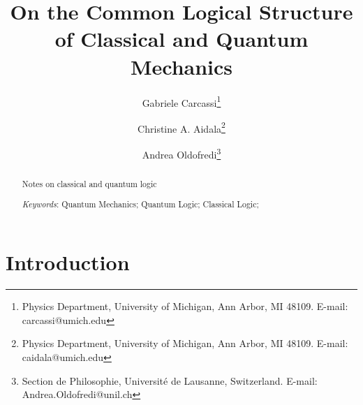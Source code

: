 \documentclass[11pt, executivepaper]{article}
\begin{document}
\title{\textbf{On the Common Logical Structure of Classical and Quantum Mechanics}}

\author{Gabriele Carcassi\thanks{Physics Department, University of Michigan, Ann Arbor, MI 48109. E-mail: carcassi@umich.edu} \and Christine A. Aidala\thanks{Physics Department, University of Michigan, Ann Arbor, MI 48109. E-mail: caidala@umich.edu} \and Andrea Oldofredi\thanks{Section de Philosophie, Universit\'e de Lausanne, Switzerland. E-mail: Andrea.Oldofredi@unil.ch}}


\maketitle

\begin{abstract}
\center Notes on classical and quantum logic
\vspace{4mm}

\noindent \emph{Keywords}: Quantum Mechanics; Quantum Logic; Classical Logic; 
\end{abstract}
\vspace{5mm}
\clearpage

\tableofcontents
\vspace{5mm}

\section{Introduction}
\end{document}
